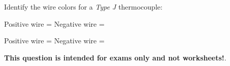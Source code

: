 

Identify the wire colors for a {\it Type J} thermocouple:

\vskip 10pt

Positive wire = \underbar{\hskip 50pt} \hskip 100pt Negative wire = \underbar{\hskip 50pt}







Positive wire =  \hskip 100pt Negative wire = 







{\bf This question is intended for exams only and not worksheets!}.



